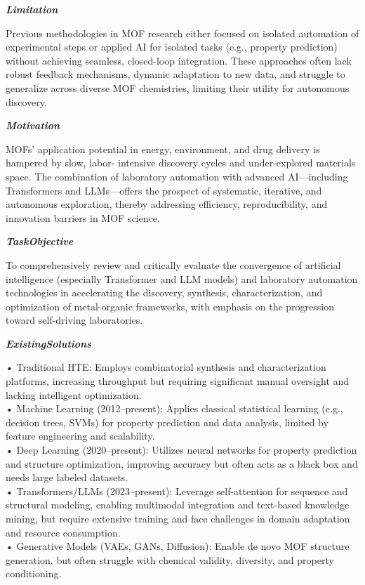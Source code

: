 \begin{tcolorbox}[
    breakable,
    title={Example of Idea Generation in Material},
    colback=LighterGray,
    colframe=DeepPurple,
    colbacktitle=DeepPurple,
    coltitle=White,
]
\textbf{\emph{\textcolor{CaseOrange}{Limitation}}}

Previous methodologies in MOF research either focused on isolated automation of experimental steps
or applied AI for isolated tasks (e.g., property prediction) without achieving seamless, closed-loop
integration. These approaches often lack robust feedback mechanisms, dynamic adaptation to new data,
and struggle to generalize across diverse MOF chemistries, limiting their utility for autonomous
discovery.

\textbf{\emph{\textcolor{CaseOrange}{Motivation}}}

MOFs' application potential in energy, environment, and drug delivery is hampered by slow, labor-
intensive discovery cycles and under-explored materials space. The combination of laboratory
automation with advanced AI—including Transformers and LLMs—offers the prospect of systematic,
iterative, and autonomous exploration, thereby addressing efficiency, reproducibility, and
innovation barriers in MOF science.

\textbf{\emph{\textcolor{CaseOrange}{TaskObjective}}}

To comprehensively review and critically evaluate the convergence of artificial intelligence
(especially Transformer and LLM models) and laboratory automation technologies in accelerating the
discovery, synthesis, characterization, and optimization of metal-organic frameworks, with emphasis
on the progression toward self-driving laboratories.

\textbf{\emph{\textcolor{CaseOrange}{ExistingSolutions}}}

• Traditional HTE: Employs combinatorial synthesis and characterization platforms, increasing throughput but requiring significant manual oversight and lacking intelligent optimization. \\
• Machine Learning (2012–present): Applies classical statistical learning (e.g., decision trees, SVMs) for property prediction and data analysis, limited by feature engineering and scalability. \\
• Deep Learning (2020–present): Utilizes neural networks for property prediction and structure optimization, improving accuracy but often acts as a black box and needs large labeled datasets. \\
• Transformers/LLMs (2023–present): Leverage self-attention for sequence and structural modeling, enabling multimodal integration and text-based knowledge mining, but require extensive training and face challenges in domain adaptation and resource consumption. \\
• Generative Models (VAEs, GANs, Diffusion): Enable de novo MOF structure generation, but often struggle with chemical validity, diversity, and property conditioning. 


\end{tcolorbox}
